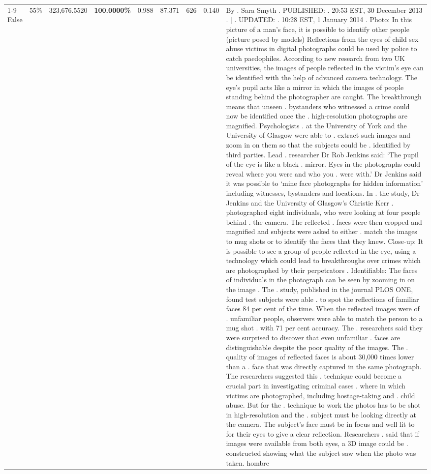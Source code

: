 \begin{table}[H]
\begin{tabular}{lllrlllll}
\cline{1-9} \cline{2-9}
False & 55\% & 323,676.5520 & \bfseries \color{red} 100.0000\% & 0.988 & 87.371 & 626 & 0.140 & By . Sara Smyth . PUBLISHED: . 20:53 EST, 30 December 2013 . | . UPDATED: . 10:28 EST, 1 January 2014 . Photo: In this picture of a man's face, it is possible to identify other people (picture posed by models) Reflections from the eyes of child sex abuse victims in digital photographs could be used by police to catch paedophiles. According to new research from two UK universities, the images of people reflected in the victim's eye can be identified with the help of advanced camera technology. The eye's pupil acts like a mirror in which the images of people standing behind the photographer are caught. The breakthrough means that unseen . bystanders who witnessed a crime could now be identified once the . high-resolution photographs are magnified. Psychologists . at the University of York and the University of Glasgow were able to . extract such images and zoom in on them so that the subjects could be . identified by third parties. Lead . researcher Dr Rob Jenkins said: ‘The pupil of the eye is like a black . mirror. Eyes in the photographs could reveal where you were and who you . were with.' Dr Jenkins said it was possible to ‘mine face photographs for hidden information' including witnesses, bystanders and locations. In . the study, Dr Jenkins and the University of Glasgow's Christie Kerr . photographed eight individuals, who were looking at four people behind . the camera. The reflected . faces were then cropped and magnified and subjects were asked to either . match the images to mug shots or to identify the faces that they knew. Close-up: It is possible to see a group of people reflected in the eye, using a technology which could lead to breakthroughs over crimes which are photographed by their perpetrators . Identifiable: The faces of individuals in the photograph can be seen by zooming in on the image . The . study, published in the journal PLOS ONE, found test subjects were able . to spot the reflections of familiar faces 84 per cent of the time. When the reflected images were of . unfamiliar people, observers were able to match the person to a mug shot . with 71 per cent accuracy. The . researchers said they were surprised to discover that even unfamiliar . faces are distinguishable despite the poor quality of the images. The . quality of images of reflected faces is about 30,000 times lower than a . face that was directly captured in the same photograph. The researchers suggested this . technique could become a crucial part in investigating criminal cases . where in which victims are photographed, including hostage-taking and . child abuse. But for the . technique to work the photos has to be shot in high-resolution and the . subject must be looking directly at the camera. The subject's face must be in focus and well lit to for their eyes to give a clear reflection. Researchers . said that if images were available from both eyes, a 3D image could be . constructed showing what the subject saw when the photo was taken. hombre \\

\end{tabular}
\end{table}
